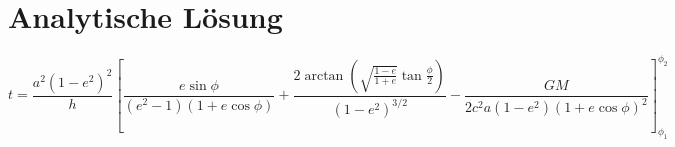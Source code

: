 \section{Analytische Lösung}
\[
t = \frac{a^2(1-e^2)^2}{h} \left[
\frac{e\sin\phi}{(e^2-1)(1+e\cos\phi)} 
+ \frac{2\arctan\left(\sqrt{\frac{1-e}{1+e}}\tan\frac{\phi}{2}\right)}{(1-e^2)^{3/2}}
- \frac{GM}{2c^2 a(1-e^2)(1+e\cos\phi)^2}
\right]_{\phi_1}^{\phi_2}
\]